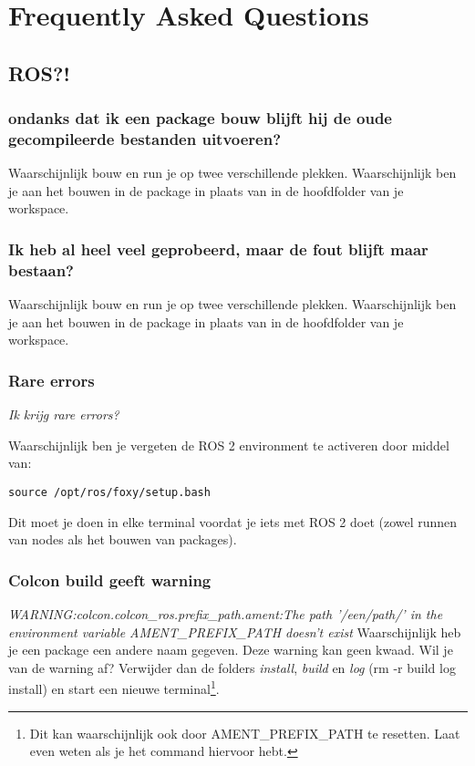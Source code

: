 \chapter{Frequently Asked Questions}

\section{ROS?!}

\subsection{ondanks dat ik een package bouw blijft hij de oude gecompileerde bestanden uitvoeren?}
Waarschijnlijk bouw en run je op twee verschillende plekken. Waarschijnlijk ben je aan het bouwen in de package in plaats van in de hoofdfolder van je workspace.

\subsection{Ik heb al heel veel geprobeerd, maar de fout blijft maar bestaan?}
Waarschijnlijk bouw en run je op twee verschillende plekken. Waarschijnlijk ben je aan het bouwen in de package in plaats van in de hoofdfolder van je workspace.



\subsection{Rare errors}
\textit{Ik krijg rare errors?}

Waarschijnlijk ben je vergeten de ROS 2 environment te activeren door middel van:
\begin{lstlisting}[style=DOS, caption=Hello world, firstnumber=0, label={code:DOS_voorbeeld}]
 source /opt/ros/foxy/setup.bash
\end{lstlisting}
Dit moet je doen in elke terminal voordat je iets met ROS 2 doet (zowel runnen van nodes als het bouwen van packages).

\subsection{Colcon build geeft warning}
\textit{WARNING:colcon.colcon\_ros.prefix\_path.ament:The path '/een/path/' in the environment variable AMENT\_PREFIX\_PATH doesn't exist}
Waarschijnlijk heb je een package een andere naam gegeven. Deze warning kan geen kwaad. Wil je van de warning af? Verwijder dan de folders \textit{install}, \textit{build} en \textit{log} (rm -r build log install) en start een nieuwe terminal\footnote{Dit kan waarschijnlijk ook door AMENT\_PREFIX\_PATH te resetten. Laat even weten als je het command hiervoor hebt.}.

